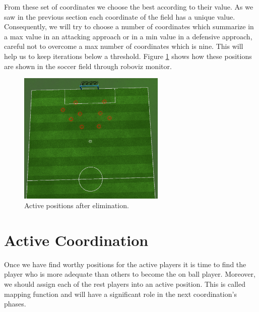 From these set of coordinates we choose the best according to their value. As we saw in the previous section each coordinate of the field has a unique value. Consequently, we will try to choose a number of coordinates which summarize in a max value in an attacking approach or in a min value in a defensive approach, careful not to overcome a max number of coordinates which is nine. This will help us to keep iterations below a threshold. Figure \ref{fig:ActivePositions3} shows how these positions are shown in the soccer field through roboviz monitor. 
\begin{figure}[htb!]
\centering
  \includegraphics[width=7cm]{Chapter4/figures/Active3.png}
  \caption{Active positions after elimination.} 
  \label{fig:ActivePositions3}
\end{figure}


\section{Active Coordination}
Once we have find worthy positions for the active players it is time to find the player who is more adequate than others to become the on ball player. Moreover, we should assign each of the rest players into an active position. This is called mapping function and will have a significant role in the next coordination's phases. 
